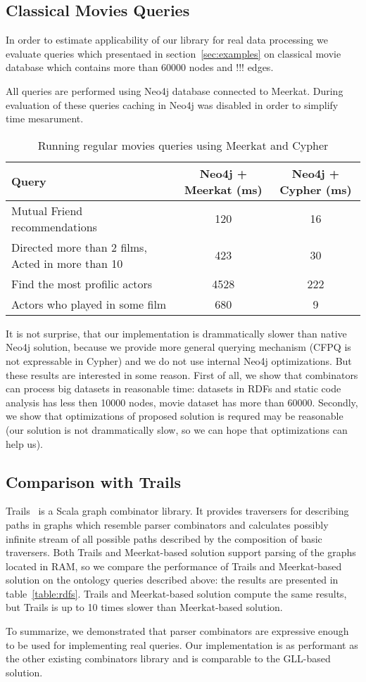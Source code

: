 \subsection{Classical Movies Queries}
In order to estimate applicability of our library for real data processing we evaluate queries 
which presentaed in section~\ref{sec:examples} on classical movie database which contains more than 
60000 nodes and !!! edges.

All queries are performed using Neo4j database connected to Meerkat.
During evaluation of these queries caching in Neo4j was disabled in order to simplify time mesarument.

\begin{table*}[t]
\centering
\begin{tabular}{|l|c|c|}
\hline
{Query} &
{Neo4j + Meerkat (ms)} &
{Neo4j + Cypher (ms)} \\
\hline
\hline
Mutual Friend recommendations & 120 & 16 \\
Directed more than 2 films, Acted in more than 10 & 423 & 30 \\
Find the most profilic actors & 4528 & 222 \\
Actors who played in some film & 680 & 9 \\
\hline
\end{tabular}
\caption{Running regular movies queries using Meerkat and Cypher}
\label{table:movies}
\end{table*}

It is not surprise, that our implementation is drammatically slower than native Neo4j solution, 
because we provide more general querying mechanism (CFPQ is not expressable in Cypher) and we do not use internal Neo4j optimizations. 
But these results are interested in some reason.
First of all, we show that combinators can process big datasets in reasonable time: datasets in RDFs and static code analysis has less then 10000 nodes, movie dataset has more than 60000.
Secondly, we show that optimizations of proposed solution is requred may be reasonable (our 
solution is not drammatically slow, so we can hope that optimizations can help us).


\subsection{Comparison with Trails}

Trails~\cite{ScalaGraphParsing} is a Scala graph combinator library.
It provides traversers for describing paths in graphs which resemble parser combinators and calculates possibly infinite stream of all possible paths described by the composition of basic traversers.
Both Trails and Meerkat-based solution support parsing of the graphs located in RAM, so we compare the performance of Trails and Meerkat-based solution on the ontology queries described above: the results are presented in table~\ref{table:rdfs}.
Trails and Meerkat-based solution compute the same results, but Trails is up to 10 times slower than Meerkat-based solution.

To summarize, we demonstrated that parser combinators are expressive enough to be used for implementing real queries. 
Our implementation is as performant as the other existing combinators library and is comparable to the GLL-based solution.
